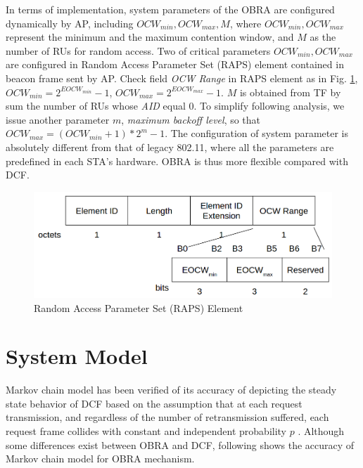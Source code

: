 \documentclass[journal]{IEEEtran}
\begin{document}
In terms of implementation, system parameters of the OBRA are configured dynamically by AP, including $OCW_{min}, OCW_{max}, M$, where $OCW_{min}, OCW_{max}$ represent the minimum and the maximum contention window, and $M$ as the number of RUs for random access. 
Two of critical parameters $OCW_{min}, OCW_{max}$ are configured in Random Access Parameter Set (RAPS) element contained in beacon frame sent by AP.
Check field \textit{OCW Range} in RAPS element as in Fig. \ref{fig_RAPS}, $OCW_{min} = 2^{EOCW_{min}}-1$, $OCW_{max} = 2^{EOCW_{max}}-1$. 
$M$ is obtained from TF by sum the number of RUs whose \textit{AID} equal 0.
To simplify following analysis, we issue another parameter $m$, \textit{maximum backoff level}, so that $OCW_{max} = (OCW_{min}+1)*2^m-1$. 
The configuration of system parameter is absolutely different from that of legacy 802.11, where all the parameters are predefined in each STA's hardware. 
OBRA is thus more flexible compared with DCF.




\begin{figure}[!h]
\includegraphics[scale=0.24]{./figure/Section_preliminary/fig_RAPS.png}
\caption{Random Access Parameter Set (RAPS) Element}
\label{fig_RAPS}
\end{figure}



\section{System Model} 		\label{sec_sys_model}
Markov chain model has been verified of its accuracy of depicting the steady state behavior of DCF based on the assumption that at each request transmission, and regardless of the number of retransmission suffered, each request frame collides with constant and independent probability $p$ \cite{bianchi2000performance}. 
Although some differences exist between OBRA and DCF, following shows the accuracy of Markov chain model for OBRA mechanism.
\end{document}
